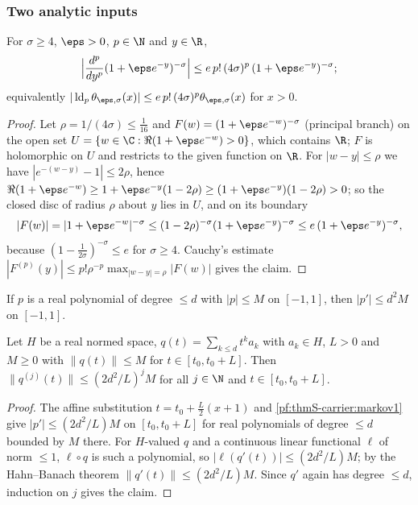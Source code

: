 \subsubsection{Two analytic inputs}
\begin{lemma}\label{pf:thmS-carrier:cauchy}
For $\sigma\ge4$, $\eps>0$, $p\in\N$ and $y\in\R$,
\[
\Bigl|\frac{d^p}{dy^p}(1+\eps e^{-y})^{-\sigma}\Bigr|\le e\,p!\,(4\sigma)^p\,(1+\eps e^{-y})^{-\sigma};
\]
equivalently $|\thmScarrierld_p\theta_{\eps,\sigma}(x)|\le e\,p!\,(4\sigma)^p\theta_{\eps,\sigma}(x)$ for $x>0$.
\end{lemma}

\begin{proof}
Let $\rho=1/(4\sigma)\le\frac1{16}$ and $F(w)=(1+\eps e^{-w})^{-\sigma}$ (principal branch) on the open set
$U=\{w\in\C:\Re(1+\eps e^{-w})>0\}$, which contains $\R$; $F$ is holomorphic on $U$ and restricts to the given function on $\R$.
For $|w-y|\le\rho$ we have $|e^{-(w-y)}-1|\le2\rho$, hence $\Re(1+\eps e^{-w})\ge1+\eps e^{-y}(1-2\rho)\ge(1+\eps
e^{-y})(1-2\rho)>0$; so the closed disc of radius $\rho$ about $y$ lies in $U$, and on its boundary
\[
|F(w)|=|1+\eps e^{-w}|^{-\sigma}\le(1-2\rho)^{-\sigma}(1+\eps e^{-y})^{-\sigma}\le e\,(1+\eps e^{-y})^{-\sigma},
\]
because $(1-\frac1{2\sigma})^{-\sigma}\le e$ for $\sigma\ge4$. Cauchy's estimate $|F^{(p)}(y)|\le p!\rho^{-p}\max_{|w-y|=\rho}
|F(w)|$ gives the claim.
\end{proof}

\begin{littheorem}\label{pf:thmS-carrier:markov1}
If $p$ is a real polynomial of degree $\le d$ with $|p|\le M$ on $[-1,1]$, then $|p'|\le d^2M$ on $[-1,1]$.
\end{littheorem}

\begin{lemma}\label{pf:thmS-carrier:markov}
Let $H$ be a real normed space, $q(t)=\sum_{k\le d}t^ka_k$ with $a_k\in H$, $L>0$ and $M\ge0$ with $\|q(t)\|\le M$ for
$t\in[t_0,t_0+L]$. Then $\|q^{(j)}(t)\|\le(2d^2/L)^jM$ for all $j\in\N$ and $t\in[t_0,t_0+L]$.
\end{lemma}

\begin{proof}
The affine substitution $t=t_0+\frac L2(x+1)$ and \cref{pf:thmS-carrier:markov1} give $|p'|\le(2d^2/L)M$ on $[t_0,t_0+L]$ for
real polynomials of degree $\le d$ bounded by $M$ there. For $H$-valued $q$ and a continuous linear functional $\ell$ of norm
$\le1$, $\ell\circ q$ is such a polynomial, so $|\ell(q'(t))|\le(2d^2/L)M$; by the Hahn--Banach theorem
$\|q'(t)\|\le(2d^2/L)M$. Since $q'$ again has degree $\le d$, induction on $j$ gives the claim.
\end{proof}

